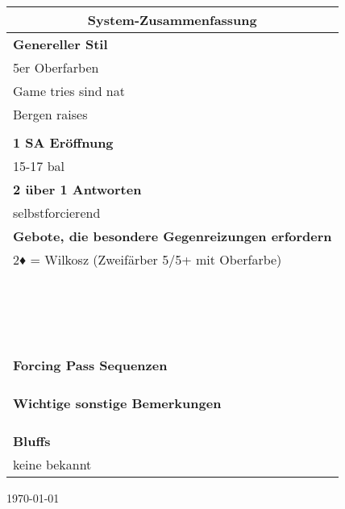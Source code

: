 \documentclass{article}
\begin{document}
\begin{multicols}{3}
\begin{tabularx}{\columnwidth}{|X|}
\hline \multicolumn{1}{c}{\bf \Large System-Zusammenfassung} \\
\hline {\bf Genereller Stil} \\
 5er Oberfarben \\
 Game tries sind nat \\
 Bergen raises \\
 \\
\hline {\bf 1 SA Eröffnung} \\
 15-17 bal \\
\hline {\bf 2 über 1 Antworten} \\
 selbstforcierend \\
\hline {\bf Gebote, die besondere Gegenreizungen erfordern} \\
 2♦ = Wilkosz (Zweifärber 5/5+ mit Oberfarbe) \\
 \\
 \\
 \\
 \\
 \\
 \\
 \\
 \\
 \\
 \\
 \\
 \\
 \\
 \\
 \\
 \\
 \\
\hline {\bf Forcing Pass Sequenzen} \\
 \\
 \\
 \\
\hline {\bf Wichtige sonstige Bemerkungen} \\
 \\
 \\
 \\
\hline {\bf Bluffs} \\
 keine bekannt \\
\hline \end{tabularx}
\begin{flushright}
{\scriptsize \today}
\end{flushright}

\end{multicols}
\end{document}
